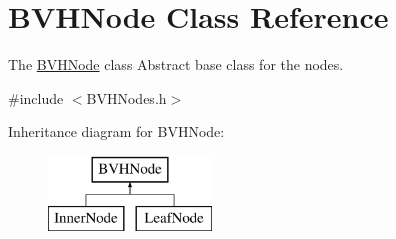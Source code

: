 \hypertarget{classBVHNode}{\section{B\-V\-H\-Node Class Reference}
\label{classBVHNode}
}


The \hyperlink{classBVHNode}{B\-V\-H\-Node} class Abstract base class for the nodes.  




{\ttfamily \#include $<$B\-V\-H\-Nodes.\-h$>$}

Inheritance diagram for B\-V\-H\-Node\-:\begin{figure}[H]
\begin{center}
\leavevmode
\includegraphics[height=2.000000cm]{classBVHNode}
\end{center}
\end{figure}
